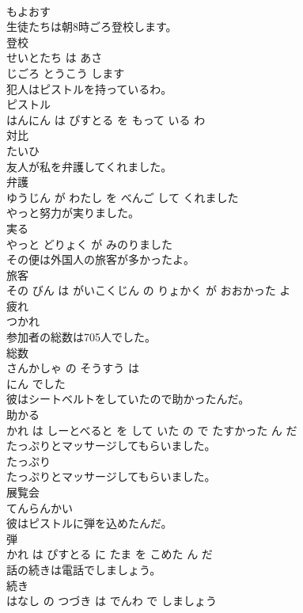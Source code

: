 \documentclass[8pt]{extreport}
\begin{document}
\begin{CJK}{UTF8}{min}
\\	もよおす		
\\	生徒たちは朝8時ごろ登校します。	
\\	登校 
\\	せいとたち は あさ 
\\	じごろ とうこう します			
\\	犯人はピストルを持っているわ。	
\\	ピストル 
\\	はんにん は ぴすとる を もって いる わ			
\\	対比	
\\	たいひ		
\\	友人が私を弁護してくれました。	
\\	弁護 
\\	ゆうじん が わたし を べんご して くれました			
\\	やっと努力が実りました。	
\\	実る 
\\	やっと どりょく が みのりました			
\\	その便は外国人の旅客が多かったよ。	
\\	旅客 
\\	その びん は がいこくじん の りょかく が おおかった よ			
\\	疲れ	
\\	つかれ		
\\	参加者の総数は705人でした。	
\\	総数 
\\	さんかしゃ の そうすう は 
\\	にん でした			
\\	彼はシートベルトをしていたので助かったんだ。	
\\	助かる 
\\	かれ は しーとべると を して いた の で たすかった ん だ			
\\	たっぷりとマッサージしてもらいました。	
\\	たっぷり 
\\	たっぷりとマッサージしてもらいました。			
\\	展覧会	
\\	てんらんかい		
\\	彼はピストルに弾を込めたんだ。	
\\	弾 
\\	かれ は ぴすとる に たま を こめた ん だ			
\\	話の続きは電話でしましょう。	
\\	続き 
\\	はなし の つづき は でんわ で しましょう			

\end{CJK}
\end{document}
